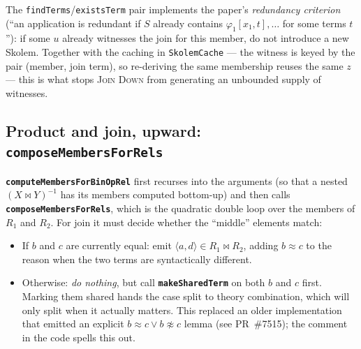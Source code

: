 \documentclass[11pt,a4paper]{article}
\newcommand{\code}[1]{\texttt{\small #1}}
\newcommand{\fn}[1]{\texttt{\small\bfseries #1}}
\newcommand{\tup}[1]{\langle #1 \rangle}
\newcommand{\transp}[1]{{#1}^{-1}}
\newcommand{\join}{\bowtie}
\theoremstyle{definition}
\begin{document}
\noindent
The \code{findTerms}/\code{existsTerm} pair implements the paper's
\emph{redundancy criterion} (``an application is redundant if $S$ already
contains $\varphi_1[x_1,t],\dots$ for some terms $t$''): if some $u$ already
witnesses the join for this member, do not introduce a new Skolem. Together
with the caching in \code{SkolemCache} --- the witness is keyed by the pair
(member, join term), so re-deriving the same membership reuses the same $z$ ---
this is what stops \textsc{Join Down} from generating an unbounded supply of
witnesses.

\subsection{Product and join, upward: \fn{composeMembersForRels}}

\fn{computeMembersForBinOpRel} first recurses into the arguments (so that a
nested $\transp{(X\join Y)}$ has its members computed bottom-up) and then calls
\fn{composeMembersForRels}, which is the quadratic double loop over the members
of $R_1$ and $R_2$. For join it must decide whether the ``middle'' elements
match:

\begin{center}
\end{center}

\begin{itemize}[leftmargin=*,itemsep=1pt]
\item If $b$ and $c$ are currently equal: emit
  $\tup{a,d}\in R_1\join R_2$, adding $b\approx c$ to the reason when the two
  terms are syntactically different.
\item Otherwise: \emph{do nothing}, but call \fn{makeSharedTerm} on both $b$
  and $c$ first. Marking them shared hands the case split to theory
  combination, which will only split when it actually matters. This replaced an
  older implementation that emitted an explicit $b\approx c \vee b\not\approx c$
  lemma (see PR~\#7515); the comment in the code spells this out.
\end{itemize}
\end{document}
